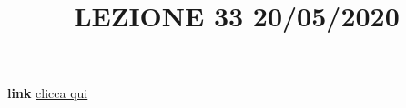 \newline
\newline
\title{LEZIONE 33 20/05/2020}\newline
\textbf{link} \href{https://web.microsoftstream.com/video/fb7480e7-4393-42e0-a124-a9e1e7171649?list=user&userId=faa91214-a6f5-40d7-8875-253fd49b8ce1}{clicca qui}
